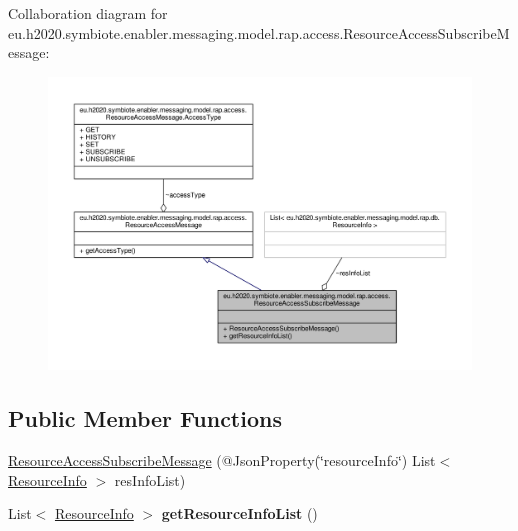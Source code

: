 Collaboration diagram for eu.\+h2020.\+symbiote.\+enabler.\+messaging.\+model.\+rap.\+access.\+Resource\+Access\+Subscribe\+Message\+:
\nopagebreak
\begin{figure}[H]
\begin{center}
\leavevmode
\includegraphics[width=350pt]{classeu_1_1h2020_1_1symbiote_1_1enabler_1_1messaging_1_1model_1_1rap_1_1access_1_1ResourceAccessSubscribeMessage__coll__graph}
\end{center}
\end{figure}
\subsection*{Public Member Functions}
\begin{DoxyCompactItemize}
\item 
\hyperlink{classeu_1_1h2020_1_1symbiote_1_1enabler_1_1messaging_1_1model_1_1rap_1_1access_1_1ResourceAccessSubscribeMessage_aebf31d18c07e21b854c7ebe065f5f233}{Resource\+Access\+Subscribe\+Message} (@Json\+Property(\char`\"{}resource\+Info\char`\"{}) List$<$ \hyperlink{classeu_1_1h2020_1_1symbiote_1_1enabler_1_1messaging_1_1model_1_1rap_1_1db_1_1ResourceInfo}{Resource\+Info} $>$ res\+Info\+List)
\item 
\mbox{\label{classeu_1_1h2020_1_1symbiote_1_1enabler_1_1messaging_1_1model_1_1rap_1_1access_1_1ResourceAccessSubscribeMessage_a7b0057c93a0e1e4f849f6a53627e29fe}} 
List$<$ \hyperlink{classeu_1_1h2020_1_1symbiote_1_1enabler_1_1messaging_1_1model_1_1rap_1_1db_1_1ResourceInfo}{Resource\+Info} $>$ {\bfseries get\+Resource\+Info\+List} ()
\end{DoxyCompactItemize}


